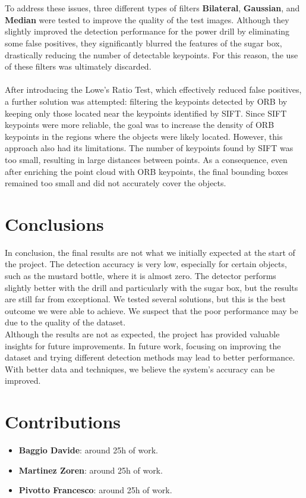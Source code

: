 \documentclass[10.5pt,a4paper]{article}
\begin{document}
\\\\
To address these issues, three different types of filters \textbf{Bilateral}, \textbf{Gaussian}, and \textbf{Median} were tested to improve the quality of the test images. Although they slightly improved the detection performance for the power drill by eliminating some false positives, they significantly blurred the features of the sugar box, drastically reducing the number of detectable keypoints. For this reason, the use of these filters was ultimately discarded.
\\\\
After introducing the Lowe's Ratio Test, which effectively reduced false positives, a further solution was attempted: filtering the keypoints detected by ORB by keeping only those located near the keypoints identified by SIFT. Since SIFT keypoints were more reliable, the goal was to increase the density of ORB keypoints in the regions where the objects were likely located. However, this approach also had its limitations. The number of keypoints found by SIFT was too small, resulting in large distances between points. As a consequence, even after enriching the point cloud with ORB keypoints, the final bounding boxes remained too small and did not accurately cover the objects.

\section*{Conclusions}
In conclusion, the final results are not what we initially expected at the start of the project. The detection accuracy is very low, especially for certain objects, such as the mustard bottle, where it is almost zero. The detector performs slightly better with the drill and particularly with the sugar box, but the results are still far from exceptional. We tested several solutions, but this is the best outcome we were able to achieve. We suspect that the poor performance may be due to the quality of the dataset.\\
Although the results are not as expected, the project has provided valuable insights for future improvements. In future work, focusing on improving the dataset and trying different detection methods may lead to better performance. With better data and techniques, we believe the system's accuracy can be improved.

\section*{Contributions}
\begin{itemize}
    \item \textbf{Baggio Davide}: around 25h of work.
    \item \textbf{Martinez Zoren}: around 25h of work.
    \item \textbf{Pivotto Francesco}: around 25h of work.
\end{itemize}
\newpage
\end{document}
